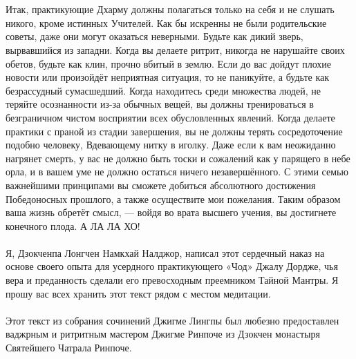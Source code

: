 \\ \\ Итак, практикующие Дхарму должны полагаться только на себя и не слушать никого, кроме истинных Учителей. Как бы искренны не были родительские советы, даже они могут оказаться неверными. Будьте как дикий зверь, вырвавшийся из западни. Когда вы делаете ритрит, никогда не нарушайте своих обетов, будьте как клин, прочно вбитый в землю. Если до вас дойдут плохие новости или произойдёт неприятная ситуация, то не паникуйте, а будьте как безрассудный сумасшедший. Когда находитесь среди множества людей, не теряйте осознанности из-за обычных вещей, вы должны тренироваться в безграничном чистом восприятии всех обусловленных явлений. Когда делаете практики с праной из стадии завершения, вы не должны терять сосредоточение подобно человеку, Вдевающему нитку в иголку. Даже если к вам неожиданно нагрянет смерть, у вас не должно быть тоски и сожалений как у парящего в небе орла, и в вашем уме не должно остаться ничего незавершённого. С этими семью важнейшими принципами вы сможете добиться абсолютного достижения Победоносных прошлого, а также осуществите мои пожелания. Таким образом ваша жизнь обретёт смысл, — войдя во врата высшего учения, вы достигнете конечного плода. А ЛА ЛА ХО!
\\ \\ 
\scriptsize
Я, Дзокченпа Лонгчен Намкхай Налджор, написал этот сердечный наказ на основе своего опыта для усердного практикующего «Чод» Джалу Дордже, чья вера и преданность сделали его превосходным преемником Тайной Мантры. Я прошу вас всех хранить этот текст рядом с местом медитации.
\\ \\ Этот текст из собрания сочинений Джигме Лингпы был любезно предоставлен
ваджрным и ритритным мастером Джигме Ринпоче из Дзокчен монастыря
Святейшего Чатрала Ринпоче.
\normalsize

